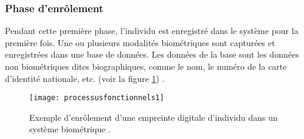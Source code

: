 \subsubsection{Phase d’enrôlement}
Pendant cette première phase, l’individu est enregistré dans le système pour la première fois. Une ou plusieurs modalités biométriques sont capturées et enregistrées dans une base de données. Les données de la base sont les données non biométriques dites biographiques, comme le nom, le numéro de la carte d’identité nationale, etc. (voir la figure \ref{fig:chapitre1enrollement}) \citep{meyer2009}.

\begin{figure}[H]
	\centering
	\texttt{[image: processusfonctionnels1]}
	\caption{Exemple d'enrôlement d’une empreinte digitale d'individu dans un système biométrique \citep{meyer2009}.}
	\label{fig:chapitre1enrollement}
\end{figure}
